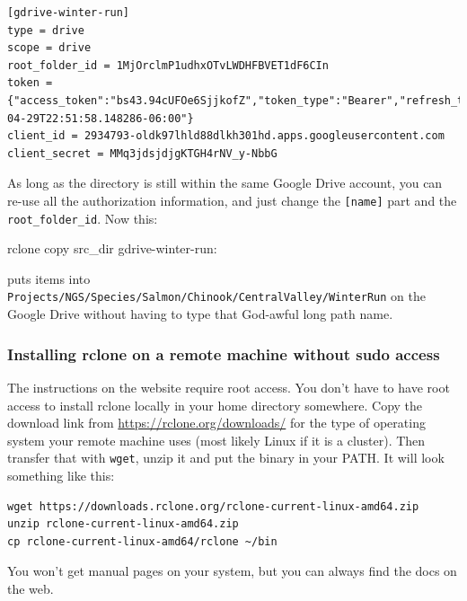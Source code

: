 \documentclass[]{krantz}
\makeatletter
\newenvironment{Shaded}{\begin{snugshade}}{\end{snugshade}}
\newcommand{\ExtensionTok}[1]{#1}
\newcommand{\NormalTok}[1]{#1}
\newenvironment{kframe}{%
\medskip{}
\setlength{\fboxsep}{.8em}
 \def\at@end@of@kframe{}%
 \ifinner\ifhmode%
  \def\at@end@of@kframe{\end{minipage}}%
  \begin{minipage}{\columnwidth}%
 \fi\fi%
 \def\FrameCommand##1{\hskip\@totalleftmargin \hskip-\fboxsep
 \colorbox{shadecolor}{##1}\hskip-\fboxsep
     \hskip-\linewidth \hskip-\@totalleftmargin \hskip\columnwidth}%
 \MakeFramed {\advance\hsize-\width
   \@totalleftmargin\z@ \linewidth\hsize
   \@setminipage}}%
 {\par\unskip\endMakeFramed%
 \at@end@of@kframe}
\renewenvironment{Shaded}{\begin{kframe}}{\end{kframe}}
\makeatother
\begin{document}
\begin{verbatim}
[gdrive-winter-run]
type = drive
scope = drive
root_folder_id = 1MjOrclmP1udhxOTvLWDHFBVET1dF6CIn
token = {"access_token":"bs43.94cUFOe6SjjkofZ","token_type":"Bearer","refresh_token":"1/MrtfsRoXhgc","expiry":"2019-04-29T22:51:58.148286-06:00"}
client_id = 2934793-oldk97lhld88dlkh301hd.apps.googleusercontent.com
client_secret = MMq3jdsjdjgKTGH4rNV_y-NbbG
\end{verbatim}

As long as the directory is still within the same Google Drive account, you can re-use
all the authorization information, and just change the \texttt{{[}name{]}} part and the \texttt{root\_folder\_id}.
Now this:

\begin{Shaded}
\begin{Highlighting}[]
\ExtensionTok{rclone}\NormalTok{ copy src_dir gdrive-winter-run: }
\end{Highlighting}
\end{Shaded}

puts items into \texttt{Projects/NGS/Species/Salmon/Chinook/CentralValley/WinterRun} on the Google Drive
without having to type that God-awful long path name.

\hypertarget{installing-rclone-on-a-remote-machine-without-sudo-access}{%
\subsubsection{Installing rclone on a remote machine without sudo access}\label{installing-rclone-on-a-remote-machine-without-sudo-access}}

The instructions on the website require root access. You don't have to have root
access to install rclone locally in your home directory somewhere.
Copy the download link from \url{https://rclone.org/downloads/} for
the type of operating system your remote machine uses (most likely Linux if it is a cluster).
Then transfer that with \texttt{wget}, unzip it and put the binary in your PATH. It will look
something like this:

\begin{verbatim}
wget https://downloads.rclone.org/rclone-current-linux-amd64.zip
unzip rclone-current-linux-amd64.zip
cp rclone-current-linux-amd64/rclone ~/bin
\end{verbatim}

You won't get manual pages on your system, but you can always find the docs on the web.
\end{document}
